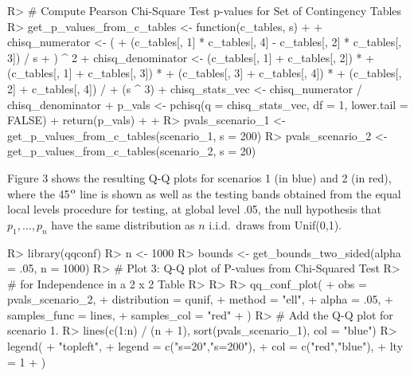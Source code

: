 \documentclass[article]{jss}
\begin{document}
%
\begin{Schunk}
\begin{Sinput}
R> # Compute Pearson Chi-Square Test p-values for Set of Contingency Tables
R> get_p_values_from_c_tables <- function(c_tables, s) {
+    
+    chisq_numerator <- (
+      (c_tables[, 1] * c_tables[, 4] - c_tables[, 2] * c_tables[, 3]) / s
+    ) ^ 2
+    chisq_denominator <- (c_tables[, 1] + c_tables[, 2]) * 
+      (c_tables[, 1] + c_tables[, 3]) * 
+      (c_tables[, 3] + c_tables[, 4]) * 
+      (c_tables[, 2] + c_tables[, 4]) / 
+      (s ^ 3)
+    chisq_stats_vec <- chisq_numerator / chisq_denominator
+    p_vals <- pchisq(q = chisq_stats_vec, df = 1, lower.tail = FALSE)
+    return(p_vals)
+    
+  }
R> pvals_scenario_1 <- get_p_values_from_c_tables(scenario_1, s = 200)
R> pvals_scenario_2 <- get_p_values_from_c_tables(scenario_2, s = 20)
\end{Sinput}
\end{Schunk}
%


Figure 3 shows the resulting Q-Q plots for scenarios 1 (in blue) and 2 (in red), where the 45$^{\mbox{\footnotesize o}}$ line is shown as well as the testing bands obtained from the equal local levels procedure for testing, at global level .05, the null hypothesis that $p_1, \ldots, p_n$ have the same distribution as $n$ i.i.d.\ draws from Unif(0,1).  

\begin{Schunk}
\begin{Sinput}
R> library(qqconf)
R> n <- 1000
R> bounds <- get_bounds_two_sided(alpha = .05, n = 1000)
R> # Plot 3: Q-Q plot of P-values from Chi-Squared Test
R> # for Independence in a 2 x 2 Table
R> 
R> 
R> qq_conf_plot(
+    obs = pvals_scenario_2,
+    distribution = qunif,
+    method = "ell",
+    alpha = .05,
+    samples_func = lines,
+    samples_col = "red"
+  )
R> # Add the Q-Q plot for scenario 1.
R> lines(c(1:n) / (n + 1), sort(pvals_scenario_1), col = "blue")
R> legend(
+    "topleft", 
+    legend = c("s=20","s=200"), 
+    col = c("red","blue"), 
+    lty = 1
+  )
\end{Sinput}
\end{Schunk}
\end{document}
